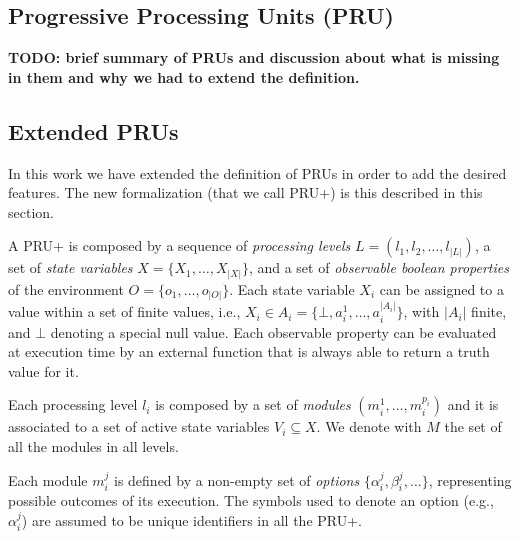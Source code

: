 \subsection{Progressive Processing Units (PRU)}

{\bf TODO: brief summary of PRUs and discussion about what is missing in them and why we had to extend the definition.}


\subsection{Extended PRUs}

In this work we have extended the definition of PRUs in order to add the desired features. The new formalization (that we call PRU+) is this described in this section.

A PRU+ is composed by a sequence of \emph{processing levels} $L = ( l_1, l_2, \ldots, l_{|L|})$, a set of \emph{state variables} $X = \{ X_1, \ldots, X_{|X|} \}$, and a set of \emph{observable boolean properties} of the environment $O = \{ o_1, \ldots, o_{|O|} \}$.
Each state variable $X_i$ can be assigned to a value within a set of finite values, i.e., $X_i \in A_i = \{ \bot , a_i^1, \ldots, a_i^{|A_i|} \}$, with $|A_i|$ finite, and $\bot$ denoting a special null value. Each observable property can be evaluated at execution time by an external function that is always able to return a truth value for it.

Each processing level $l_i$ is composed by a set of \emph{modules} $( m_i^1, \ldots, m_i^{p_i} )$ and it is associated to a set of active state variables $V_i \subseteq X$.
We denote with $M$ the set of all the modules in all levels.

Each module $m_i^j$ is defined by a non-empty set of \emph{options} $\{ \alpha_i^j, \beta_i^j, \ldots \}$, representing possible outcomes of its execution. The symbols used to denote an option (e.g., $\alpha_i^j$) are assumed to be unique identifiers in all the PRU+.

